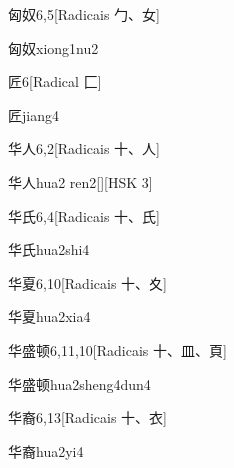 \begin{entry}{匈奴}{6,5}[Radicais ⼓、⼥]
  \begin{phonetics}{匈奴}{xiong1nu2}
  \end{phonetics}
\end{entry}

\begin{entry}{匠}{6}[Radical ⼕]
  \begin{phonetics}{匠}{jiang4}
  \end{phonetics}
\end{entry}

\begin{entry}{华人}{6,2}[Radicais ⼗、⼈]
  \begin{phonetics}{华人}{hua2 ren2}[][HSK 3]
  \end{phonetics}
\end{entry}

\begin{entry}{华氏}{6,4}[Radicais ⼗、⽒]
  \begin{phonetics}{华氏}{hua2shi4}
  \end{phonetics}
\end{entry}

\begin{entry}{华夏}{6,10}[Radicais ⼗、⼢]
  \begin{phonetics}{华夏}{hua2xia4}
  \end{phonetics}
\end{entry}

\begin{entry}{华盛顿}{6,11,10}[Radicais ⼗、⽫、⾴]
  \begin{phonetics}{华盛顿}{hua2sheng4dun4}
  \end{phonetics}
\end{entry}

\begin{entry}{华裔}{6,13}[Radicais ⼗、⾐]
  \begin{phonetics}{华裔}{hua2yi4}
  \end{phonetics}
\end{entry}

